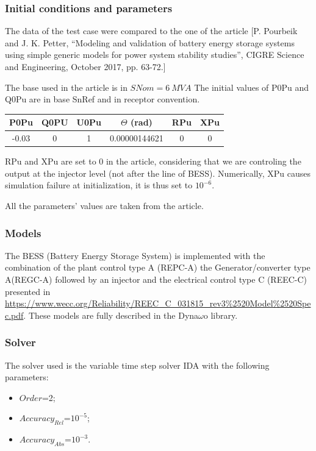\documentclass[a4paper, 12pt]{report}
\begin{document}
\subsubsection{Initial conditions and parameters}
The data of the test case were compared to the one of the article
[P. Pourbeik and J. K. Petter, “Modeling and validation of battery energy storage systems
using simple generic models for power system stability studies”, CIGRE Science and
Engineering, October 2017, pp. 63-72.]

The base used in the article is in $SNom =6\ MVA$
The initial values of P0Pu and Q0Pu are in base SnRef and in receptor convention.

\begin{center}
\begin{tabular}{|c|c|c|c|c|c|}
  \hline
 P0Pu & Q0PU & U0Pu & $\Theta$ (rad) & RPu & XPu\\
  \hline
 -0.03 & 0 & 1 & 0.00000144621 & 0 & 0\\
  \hline
\end{tabular}
\end{center}

RPu and XPu are set to 0 in the article, considering that we are controling the output at the injector level (not after the line of BESS).
Numerically, XPu causes simulation failure at initialization, it is thus set to $10^{-6}$.

All the parameters' values are taken from the article.

\subsubsection{Models}

The BESS (Battery Energy Storage System) is implemented with the combination of the plant control type A (REPC-A) the Generator/converter type A(REGC-A) followed by an injector and the electrical control type C (REEC-C) presented in \url{https://www.wecc.org/Reliability/REEC\_C\_031815\_rev3\%2520Model\%2520Spec.pdf}.
These models are fully described in the Dyna$\omega$o library.

\subsubsection{Solver}

\par The solver used is the variable time step solver IDA with the following parameters:
\begin{itemize}
\item $Order$=2;
\item $Accuracy_{Rel}$=$10^{-5}$;
\item $Accuracy_{Abs}$=$10^{-3}$.
\end{itemize}
\end{document}
